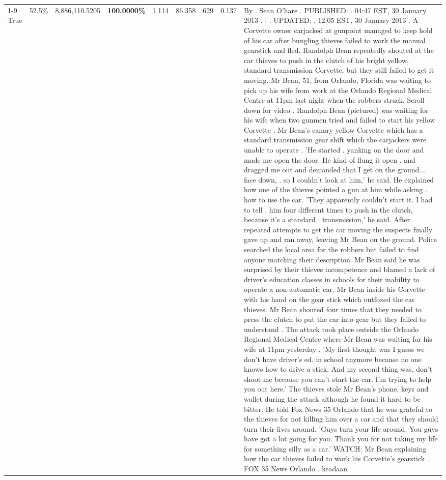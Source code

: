 \begin{table}[H]
\begin{tabular}{lllrlllll}
\cline{1-9} \cline{2-9}
True & 52.5\% & 8,886,110.5205 & \bfseries \color{red} 100.0000\% & 1.114 & 86.358 & 629 & 0.137 & By . Sean O'hare . PUBLISHED: . 04:47 EST, 30 January 2013 . | . UPDATED: . 12:05 EST, 30 January 2013 . A Corvette owner carjacked at gunpoint managed to keep hold of his car after bungling thieves failed to work the manual gearstick and fled. Randolph Bean repeatedly shouted at the car thieves to push in the clutch of his bright yellow, standard transmission Corvette, but they still failed to get it moving. Mr Bean, 51, from Orlando, Florida was waiting to pick up his wife from work at the Orlando Regional Medical Centre at 11pm last night when the robbers struck. Scroll down for video . Randolph Bean (pictured) was waiting for his wife when two gunmen tried and failed to start his yellow Corvette . Mr Bean's canary yellow Corvette which has a standard transmission gear shift which the carjackers were unable to operate . 'He started . yanking on the door and made me open the door. He kind of flung it open . and dragged me out and demanded that I get on the ground... face down, . so I couldn't look at him,' he said. He explained how one of the thieves pointed a gun at him while asking . how to use the car. 'They apparently couldn't start it. I had to tell . him four different times to push in the clutch, because it's a standard . transmission,' he said. After repeated attempts to get the car moving the suspects finally gave up and ran away, leaving Mr Bean on the ground. Police searched the local area for the robbers but failed to find anyone matching their description. Mr Bean said he was surprised by their thieves incompetence and blamed a lack of driver's education classes in schools for their inability to operate a non-automatic car. Mr Bean inside his Corvette with his hand on the gear stick which outfoxed the car thieves. Mr Bean shouted four times that they needed to press the clutch to put the car into gear but they failed to understand . The attack took place outside the Orlando Regional Medical Centre where Mr Bean was waiting for his wife at 11pm yesterday . 'My first thought was I guess we don't have driver's ed. in school anymore because no one knows how to drive a stick. And my second thing was, don't shoot me because you can't start the car. I'm trying to help you out here.' The thieves stole Mr Bean's phone, keys and wallet during the attack although he found it hard to be bitter. He told Fox News 35 Orlando that he was grateful to the thieves for not killing him over a car and that they should turn their lives around. 'Guys turn your life around. You guys have got a lot going for you. Thank you for not taking my life for something silly as a car.' WATCH: Mr Bean explaining how the car thieves failed to work his Corvette's gearstick . FOX 35 News Orlando . keadaan \\

\end{tabular}
\end{table}
